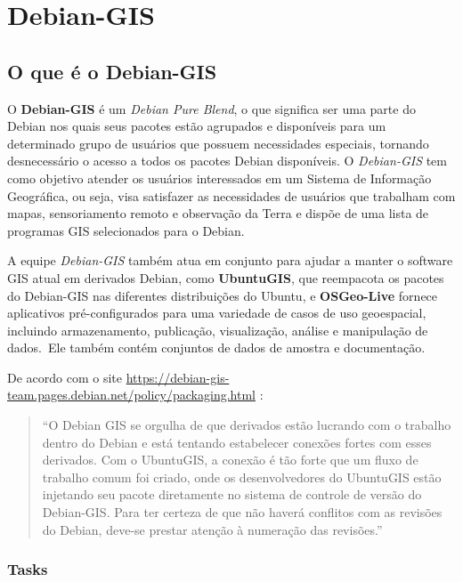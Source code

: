 \chapter{Debian-GIS}
\section{O que é o Debian-GIS}

O \textbf{Debian-GIS} é um \textit{Debian Pure Blend}, o que significa ser uma parte do Debian nos quais seus pacotes estão agrupados e disponíveis para um determinado grupo de usuários que possuem necessidades especiais, tornando desnecessário o acesso a todos os pacotes Debian disponíveis. O \textit{Debian-GIS} tem como objetivo atender os usuários interessados em um Sistema de Informação Geográfica, ou seja, visa satisfazer as necessidades de usuários que trabalham com mapas, sensoriamento remoto e observação da Terra e dispõe de uma lista de programas GIS selecionados para o Debian.

A equipe \textit{Debian-GIS} também atua em conjunto para ajudar a manter o software GIS atual em derivados Debian, como \textbf{UbuntuGIS}, que reempacota os pacotes do Debian-GIS nas diferentes distribuições do Ubuntu, e \textbf{OSGeo-Live} fornece aplicativos pré-configurados para uma variedade de casos de uso geoespacial, incluindo armazenamento, publicação, visualização, análise e manipulação de dados. Ele também contém conjuntos de dados de amostra e documentação.

De acordo com o site \url{https://debian-gis-team.pages.debian.net/policy/packaging.html} \cite{bib:gis}:

\begin{quote}
	``O Debian GIS se orgulha de que derivados estão lucrando com o trabalho dentro do Debian e está tentando estabelecer conexões fortes com esses derivados. Com o UbuntuGIS, a conexão é tão forte que um fluxo de trabalho comum foi criado, onde os desenvolvedores do UbuntuGIS estão injetando seu pacote diretamente no sistema de controle de versão do Debian-GIS. Para ter certeza de que não haverá conflitos com as revisões do Debian, deve-se prestar atenção à numeração das revisões.''
\end{quote}

\subsection{Tasks}

